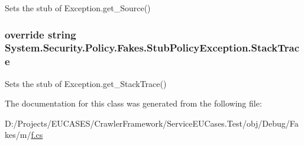 Sets the stub of Exception.\-get\-\_\-\-Source()

\hypertarget{class_system_1_1_security_1_1_policy_1_1_fakes_1_1_stub_policy_exception_abe3e728e16c05014d812617d3e90883e}{
\subsubsection[{Stack\-Trace}]{\setlength{\rightskip}{0pt plus 5cm}override string System.\-Security.\-Policy.\-Fakes.\-Stub\-Policy\-Exception.\-Stack\-Trace\hspace{0.3cm}{\ttfamily [get]}}}\label{class_system_1_1_security_1_1_policy_1_1_fakes_1_1_stub_policy_exception_abe3e728e16c05014d812617d3e90883e}


Sets the stub of Exception.\-get\-\_\-\-Stack\-Trace()



The documentation for this class was generated from the following file\-:\begin{DoxyCompactItemize}
\item 
D\-:/\-Projects/\-E\-U\-C\-A\-S\-E\-S/\-Crawler\-Framework/\-Service\-E\-U\-Cases.\-Test/obj/\-Debug/\-Fakes/m/\hyperlink{m_2f_8cs}{f.\-cs}\end{DoxyCompactItemize}
